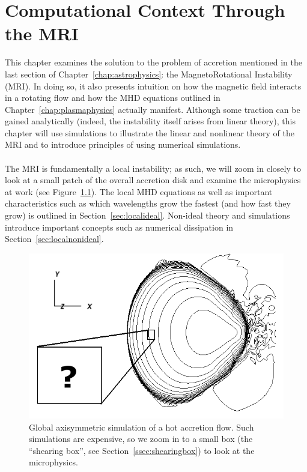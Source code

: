 \chapter{Computational Context Through the MRI} \label{chap:compMRI}
This chapter examines the solution to the problem of accretion mentioned in the last section of Chapter~\ref{chap:astrophysics}: the MagnetoRotational Instability (MRI). In doing so, it also presents intuition on how the magnetic field interacts in a rotating flow and how the MHD equations outlined in Chapter~\ref{chap:plasmaphysics} actually manifest. Although some traction can be gained analytically (indeed, the instability itself arises from linear theory), this chapter will use simulations to illustrate the linear and nonlinear theory of the MRI and to introduce principles of using numerical simulations. \\
\\
The MRI is fundamentally a local instability; as such, we will zoom in closely to look at a small patch of the overall accretion disk and examine the microphysics at work (see Figure~\ref{fig:global}). The local MHD equations as well as important characteristics such as which wavelengths grow the fastest (and how fast they grow) is outlined in Section~\ref{sec:localideal}. Non-ideal theory and simulations introduce important concepts such as numerical dissipation in Section~\ref{sec:localnonideal}. 
\begin{figure}[h]
  \begin{center}  
    \includegraphics[width=.9\textwidth, angle=0.]{img/global.png}
  \end{center}
  \caption{Global axisymmetric simulation of a hot accretion flow. Such simulations are expensive, so we zoom in to a small box (the ``shearing box'', see Section~\ref{ssec:shearingbox}) to look at the microphysics.}
  \label{fig:global}
\end{figure}

